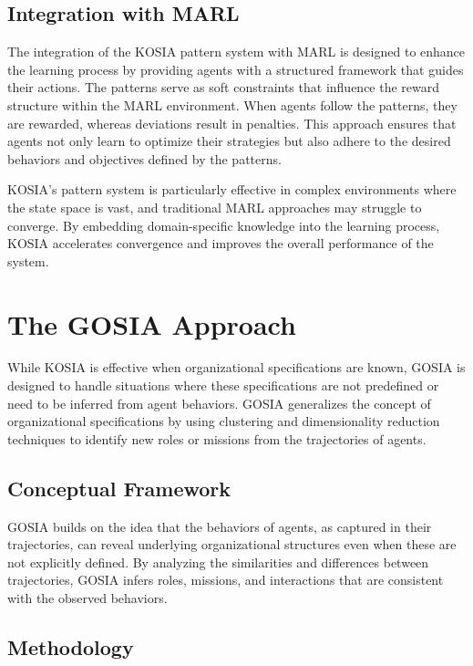 \documentclass[sn-mathphys-num]{sn-jnl}%
\theoremstyle{thmstyleone}%
\theoremstyle{thmstyletwo}%
\theoremstyle{thmstylethree}%
\begin{document}
\subsection{Integration with MARL}
The integration of the KOSIA pattern system with MARL is designed to enhance the learning process by providing agents with a structured framework that guides their actions. The patterns serve as soft constraints that influence the reward structure within the MARL environment. When agents follow the patterns, they are rewarded, whereas deviations result in penalties. This approach ensures that agents not only learn to optimize their strategies but also adhere to the desired behaviors and objectives defined by the patterns.

KOSIA's pattern system is particularly effective in complex environments where the state space is vast, and traditional MARL approaches may struggle to converge. By embedding domain-specific knowledge into the learning process, KOSIA accelerates convergence and improves the overall performance of the system.




\section{The GOSIA Approach}
\label{sec:gosia}

While KOSIA is effective when organizational specifications are known, GOSIA is designed to handle situations where these specifications are not predefined or need to be inferred from agent behaviors. GOSIA generalizes the concept of organizational specifications by using clustering and dimensionality reduction techniques to identify new roles or missions from the trajectories of agents.

\subsection{Conceptual Framework}

GOSIA builds on the idea that the behaviors of agents, as captured in their trajectories, can reveal underlying organizational structures even when these are not explicitly defined. By analyzing the similarities and differences between trajectories, GOSIA infers roles, missions, and interactions that are consistent with the observed behaviors.

\subsection{Methodology}
\end{document}
